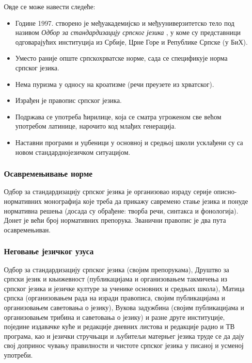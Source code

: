 {\begin{multicols}{2}

 Овде се може навести следеће:
\begin{itemize}
\item Године 1997. створено је међуакадемијско и међууниверзитетско тело под називом \textit{Одбор за стандардизацију српског језика} \cite{BSSL}, у коме су представници одговарајућих институција из Србије, Црне Горе и Републике Српске (у БиХ). 
\item Уместо раније опште српскохрватске норме, сада се спецификује норма српског језика.
\item Нема пуризма у односу на кроатизме (речи преузете из хрватског). 
\item Израђен је правопис српског језика.
\item Подржава се употреба ћирилице, која се сматра угроженом све већом употребом латинице, нарочито код млађих генерација. 
\item Наставни програми и уџбеници у основној и средњој школи усклађени су са новом стандарднојезичком ситуацијом.
\end{itemize}
 
 \subsubsection {Осавремењивање норме}
   
  Одбор за стандардизацију српског језика је организовао израду серије описно-нормативних монографија које треба да прикажу савремено стање језика и понуде нормативна решења (досада су обрађене: творба речи, синтакса и фонологија). Донет је већи број нормативних препорука. Званични правопис је два пута осавремењиван.

 \subsubsection {Неговање језичког узуса}
 
Одбор за стандардизацију српског језика (својим препорукама), Друштво за српски језик и књижевност (публикацијама и организовањем такмичења из српског језика и језичке културе за ученике основних и средњих  школа), Матица српска (организовањем рада на изради правописа, својим публикацијама и организовањем саветовања о језику), Вукова задужбина (својим публикацијама и организовањем трибина и саветовања о језику) и разне друге институције, поједине издавачке куће и редакције дневних листова и редакције радио и ТВ програма, као и језички стручњаци и љубитељи матерњег језика труде се да дају свој допринос чувању правилности и чистоте српског језика у писаној и усменој употреби.  


\end{multicols}}
